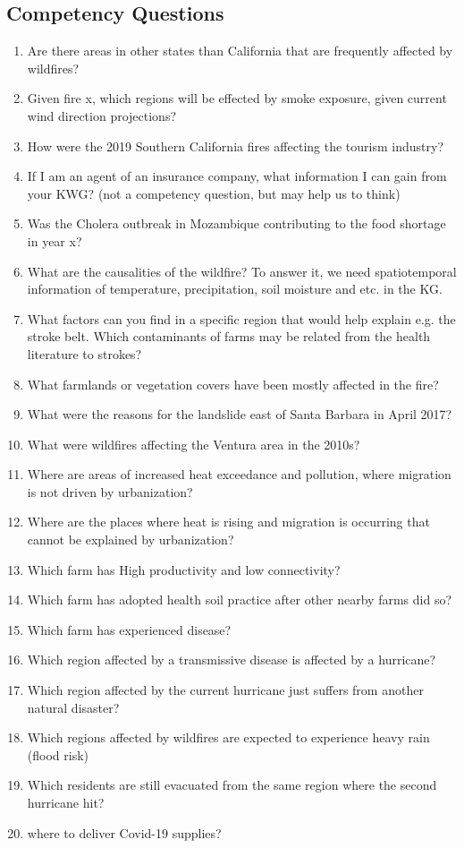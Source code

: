 \subsection{Competency Questions}
\label{ssec:cqs}
\begin{enumerate}[\phantom{CQ }CQ 1.]
	\item Are there areas in other states than California that are frequently affected by wildfires?
	\item Given fire x, which regions will be effected by smoke exposure, given current wind direction projections?
	\item How were the 2019 Southern California fires affecting the tourism industry?
	\item If I am an agent of an insurance company, what information I can gain from your KWG? (not a competency question, but may help us to think)
	\item Was the Cholera outbreak in Mozambique contributing to the food shortage in year x?
	\item What are the causalities of the wildfire? To answer it, we need spatiotemporal information of temperature, precipitation, soil moisture and etc. in the KG.
	\item What factors can you find in a specific region that would help explain e.g. the stroke belt. Which contaminants of farms may be related from the health literature to strokes?
	\item What farmlands or vegetation covers have been mostly affected in the fire?
	\item What were the reasons for the landslide east of Santa Barbara in April 2017?
	\item What were wildfires affecting the Ventura area in the 2010s?
	\item Where are areas of increased heat exceedance and pollution, where migration is not driven by urbanization?
	\item Where are the places where heat is rising and migration is occurring that cannot be explained by urbanization?
	\item Which farm has High productivity and low connectivity?
	\item Which farm has adopted health soil practice after other nearby farms did so?
	\item Which farm has experienced disease?
	\item Which region affected by a transmissive disease is affected by a hurricane?
	\item Which region affected by the current hurricane just suffers from another natural disaster?
	\item Which regions affected by wildfires are expected to experience heavy rain (flood risk)
	\item Which residents are still evacuated from the same region where the second hurricane hit?
	\item where to deliver Covid-19 supplies?
\end{enumerate}

